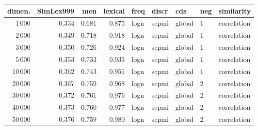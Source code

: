 \begin{tabular}{rrrrlllll}
\toprule
 dimen. &  SimLex999 &    men &  lexical &  freq &  discr &     cds & neg &   similarity \\
\midrule
           1\,000 &      0.334 &  0.681 &    0.875 &  logn &  scpmi &  global &   1 &  correlation \\
           2\,000 &      0.349 &  0.718 &    0.918 &  logn &  scpmi &  global &   1 &  correlation \\
           3\,000 &      0.350 &  0.726 &    0.924 &  logn &  scpmi &  global &   1 &  correlation \\
           5\,000 &      0.353 &  0.733 &    0.933 &  logn &  scpmi &  global &   1 &  correlation \\
          10\,000 &      0.362 &  0.743 &    0.951 &  logn &  scpmi &  global &   1 &  correlation \\
          20\,000 &      0.367 &  0.759 &    0.968 &  logn &  scpmi &  global &   2 &  correlation \\
          30\,000 &      0.372 &  0.761 &    0.976 &  logn &  scpmi &  global &   2 &  correlation \\
          40\,000 &      0.373 &  0.760 &    0.977 &  logn &  scpmi &  global &   2 &  correlation \\
          50\,000 &      0.376 &  0.759 &    0.980 &  logn &  scpmi &  global &   2 &  correlation \\
\bottomrule
\end{tabular}
